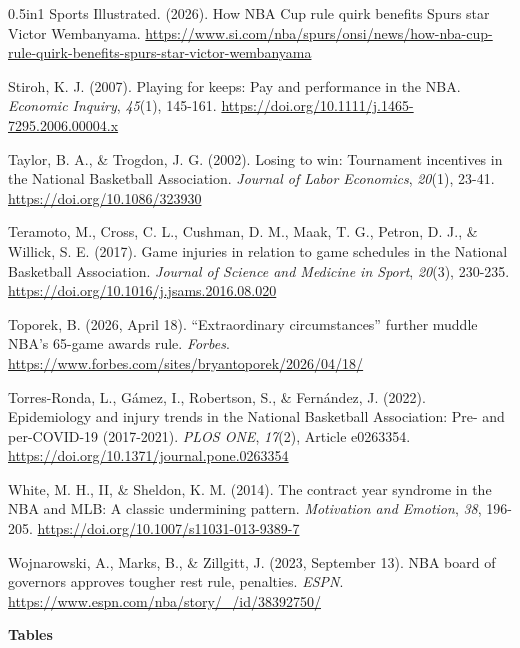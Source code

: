 \documentclass[12pt]{article}
\newcommand{\lone}[1]{\par\medskip\noindent\begin{center}\textbf{#1}\end{center}\par\nopagebreak}
\begin{document}
\begin{hangparas}{0.5in}{1}
Sports Illustrated. (2026). How NBA Cup rule quirk benefits Spurs star Victor Wembanyama. \url{https://www.si.com/nba/spurs/onsi/news/how-nba-cup-rule-quirk-benefits-spurs-star-victor-wembanyama}

Stiroh, K. J. (2007). Playing for keeps: Pay and performance in the NBA. \emph{Economic Inquiry}, \emph{45}(1), 145-161. \url{https://doi.org/10.1111/j.1465-7295.2006.00004.x}

Taylor, B. A., \& Trogdon, J. G. (2002). Losing to win: Tournament incentives in the National Basketball Association. \emph{Journal of Labor Economics}, \emph{20}(1), 23-41. \url{https://doi.org/10.1086/323930}

Teramoto, M., Cross, C. L., Cushman, D. M., Maak, T. G., Petron, D. J., \& Willick, S. E. (2017). Game injuries in relation to game schedules in the National Basketball Association. \emph{Journal of Science and Medicine in Sport}, \emph{20}(3), 230-235. \url{https://doi.org/10.1016/j.jsams.2016.08.020}

Toporek, B. (2026, April 18). ``Extraordinary circumstances'' further muddle NBA's 65-game awards rule. \emph{Forbes}. \url{https://www.forbes.com/sites/bryantoporek/2026/04/18/}

Torres-Ronda, L., Gámez, I., Robertson, S., \& Fernández, J. (2022). Epidemiology and injury trends in the National Basketball Association: Pre- and per-COVID-19 (2017-2021). \emph{PLOS ONE}, \emph{17}(2), Article e0263354. \url{https://doi.org/10.1371/journal.pone.0263354}

White, M. H., II, \& Sheldon, K. M. (2014). The contract year syndrome in the NBA and MLB: A classic undermining pattern. \emph{Motivation and Emotion}, \emph{38}, 196-205. \url{https://doi.org/10.1007/s11031-013-9389-7}

Wojnarowski, A., Marks, B., \& Zillgitt, J. (2023, September 13). NBA board of governors approves tougher rest rule, penalties. \emph{ESPN}. \url{https://www.espn.com/nba/story/_/id/38392750/}

\end{hangparas}
\clearpage
\lone{Tables}

\clearpage

\clearpage

\clearpage

\clearpage

\clearpage

\clearpage

\end{document}
